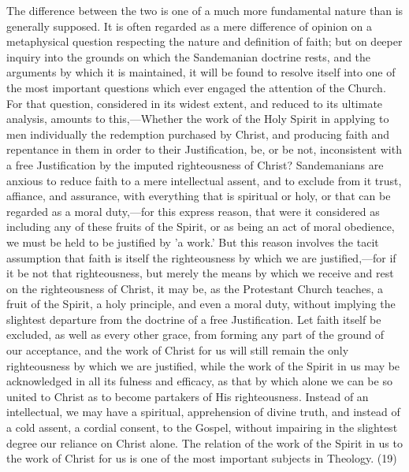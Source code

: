 \documentclass[
]{book}
\begin{document}
The difference between the two is one of a much more fundamental nature than is generally supposed. It is often regarded as a mere difference of opinion on a metaphysical question respecting the nature and definition of faith; but on deeper inquiry into the grounds on which the Sandemanian doctrine rests, and the arguments by which it is maintained, it will be found to resolve itself into one of the most important questions which ever engaged the attention of the Church. For that question, considered in its widest extent, and reduced to its ultimate analysis, amounts to this,---Whether the work of the Holy Spirit in applying to men individually the redemption purchased by Christ, and producing faith and repentance in them in order to their Justification, be, or be not, inconsistent with a free Justification by the imputed righteousness of Christ? Sandemanians are anxious to reduce faith to a mere intellectual assent, and to exclude from it trust, affiance, and assurance, with everything that is spiritual or holy, or that can be regarded as a moral duty,---for this express reason, that were it considered as including any of these fruits of the Spirit, or as being an act of moral obedience, we must be held to be justified by 'a work.' But this reason involves the tacit assumption that faith is itself the righteousness by which we are justified,---for if it be not that righteousness, but merely the means by which we receive and rest on the righteousness of Christ, it may be, as the Protestant Church teaches, a fruit of the Spirit, a holy principle, and even a moral duty, without implying the slightest departure from the doctrine of a free Justification. Let faith itself be excluded, as well as every other grace, from forming any part of the ground of our acceptance, and the work of Christ for us will still remain the only righteousness by which we are justified, while the work of the Spirit in us may be acknowledged in all its fulness and efficacy, as that by which alone we can be so united to Christ as to become partakers of His righteousness. Instead of an intellectual, we may have a spiritual, apprehension of divine truth, and instead of a cold assent, a cordial consent, to the Gospel, without impairing in the slightest degree our reliance on Christ alone. The relation of the work of the Spirit in us to the work of Christ for us is one of the most important subjects in Theology. (19)
\end{document}
